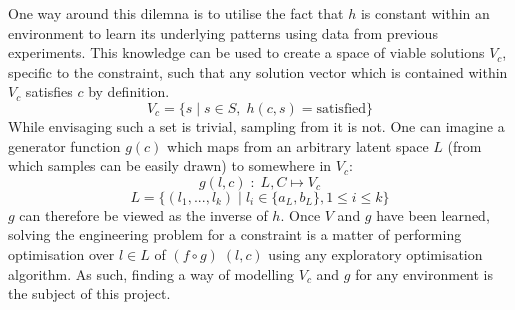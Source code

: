 \documentclass[../../main.tex]{subfiles}
\begin{document}
One way around this dilemna is to utilise the fact that $h$ is constant within an environment to learn its underlying patterns using data from previous experiments.
This knowledge can be used to create a space of viable solutions $V_c$, specific to the constraint, such that any solution vector which is contained within $V_c$ satisfies $c$ by definition.
\begin{equation}
    V_c=\{s\;|\;s\in S,\;h(c,s)=\text{satisfied}\}
\end{equation}
While envisaging such a set is trivial, sampling from it is not.
One can imagine a generator function $g(c)$ which maps from an arbitrary latent space $L$ (from which samples can be easily drawn) to somewhere in $V_c$:
\begin{equation}
    g(l,c)\;:\;L,C\mapsto V_c
\end{equation}
\begin{equation}
    L=\{(l_1,...,l_k)\;|\;l_i\in\{a_L,b_L\},1\le i\le k\}
\end{equation}
$g$ can therefore be viewed as the inverse of $h$.
Once $V$ and $g$ have been learned, solving the engineering problem for a constraint is a matter of performing optimisation over $l\in L$ of $(f\circ g)\;(l,c)$ using any exploratory optimisation algorithm.
As such, finding a way of modelling $V_c$ and $g$ for any environment is the subject of this project.
\end{document}
